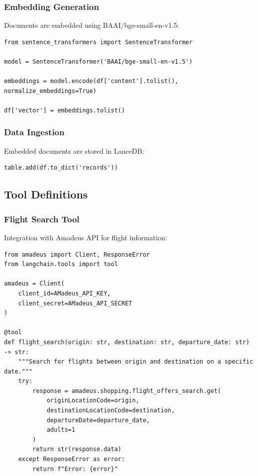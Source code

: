 \documentclass[12pt,a4paper]{article}
\begin{document}
\subsubsection{Embedding Generation}
Documents are embedded using BAAI/bge-small-en-v1.5:

\begin{lstlisting}
from sentence_transformers import SentenceTransformer

model = SentenceTransformer('BAAI/bge-small-en-v1.5')

embeddings = model.encode(df['content'].tolist(), normalize_embeddings=True)

df['vector'] = embeddings.tolist()
\end{lstlisting}

\subsubsection{Data Ingestion}
Embedded documents are stored in LanceDB:

\begin{lstlisting}
table.add(df.to_dict('records'))
\end{lstlisting}

\subsection{Tool Definitions}

\subsubsection{Flight Search Tool}
Integration with Amadeus API for flight information:

\begin{lstlisting}
from amadeus import Client, ResponseError
from langchain.tools import tool

amadeus = Client(
    client_id=AMadeus_API_KEY,
    client_secret=AMadeus_API_SECRET
)

@tool
def flight_search(origin: str, destination: str, departure_date: str) -> str:
    """Search for flights between origin and destination on a specific date."""
    try:
        response = amadeus.shopping.flight_offers_search.get(
            originLocationCode=origin,
            destinationLocationCode=destination,
            departureDate=departure_date,
            adults=1
        )
        return str(response.data)
    except ResponseError as error:
        return f"Error: {error}"
\end{lstlisting}
\end{document}

